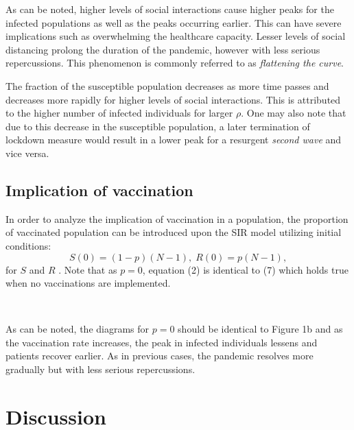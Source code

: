 \documentclass[12pt]{article}
\begin{document}
\noindent As can be noted, higher levels of social interactions cause higher peaks for the infected populations as well as the peaks occurring earlier. This can have severe implications such as overwhelming the healthcare capacity. Lesser levels of social distancing prolong the duration of the pandemic, however with less serious repercussions. 
This phenomenon is commonly referred to as \textit{flattening the curve}.

The fraction of the susceptible population decreases as more time passes and decreases more rapidly for higher levels of social interactions. 
\newpage 
\noindent This is attributed to the higher number of infected individuals for larger $\rho$. One may also note that due to this decrease in the susceptible population, a later termination of lockdown measure would result in a lower peak for a resurgent \textit{second wave} and vice versa.

\subsection{Implication of vaccination}
In order to analyze the implication of vaccination in a population, the proportion of vaccinated population can be introduced upon the SIR model utilizing initial conditions:
\begin{equation}
S(0) = (1-p)(N-1), \; R(0) = p(N-1),  
\end{equation}
for $S$ and $R$ \cite{ashraf}. Note that as $p = 0$, equation (2) is identical to (7) which holds true when no vaccinations are implemented. 

\begin{figure*}[ht!]
\begin{center}
   \\
   \caption{\label{workflow} (a) 40 \% vaccination rate (b) 50 \% vaccination rate}
\end{center}
\end{figure*}
\noindent As can be noted, the diagrams for $p = 0$ should be identical to Figure 1b and as the vaccination rate increases, the peak in infected individuals lessens and patients recover earlier. As in previous cases, the pandemic resolves more gradually but with less serious repercussions.

\section{Discussion}
\end{document}
